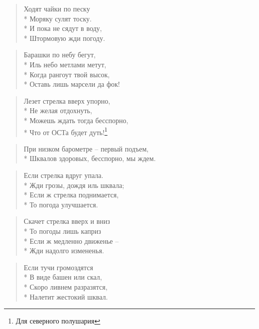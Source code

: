 \documentclass[a4paper, 12pt, twoside, final, book, russian, fittopage, cyremdash]{ncc}
\begin{document}
\begin{multicols}{2}

\small

\begin{quote}
Ходят чайки по песку \\*
Моряку сулят тоску. \\*
И пока не сядут в воду, \\*
Штормовую жди погоду.
\end{quote}

\begin{quote}
Барашки по небу бегут, \\*
Иль небо метлами метут, \\*
Когда рангоут твой высок, \\*
Оставь лишь марсели да фок!
\end{quote}

\begin{quote}
Лезет стрелка вверх упорно, \\*
Не желая отдохнуть, \\*
Можешь ждать тогда бесспорно, \\*
Что от ОСТа будет дуть!\footnote{Для северного полушария}
\end{quote}

\begin{quote}
При низком барометре \--- первый подъем, \\*
Шквалов здоровых, бесспорно, мы ждем.
\end{quote}

\begin{quote}
Если стрелка вдруг упала. \\*
Жди грозы, дождя иль шквала; \\*
Если ж стрелка поднимается, \\*
То погода улучшается.
\end{quote}

\begin{quote}
Скачет стрелка вверх и вниз \\*
То погоды лишь каприз \\*
Если ж медленно движенье \--- \\*
Жди надолго измененья.
\end{quote}

\begin{quote}
Если тучи громоздятся \\*
В виде башен или скал, \\*
Скоро ливнем разразятся, \\*
Налетит жестокий шквал.
\end{quote}


\end{multicols}
\end{document}
